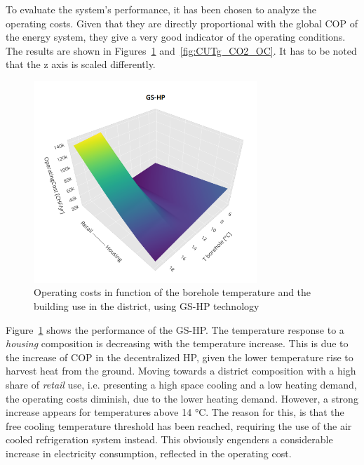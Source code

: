 \documentclass{article}
\begin{document}
To evaluate the system's performance, it has been chosen to analyze the operating costs. Given that they are directly proportional with the global COP of the energy system, they give a very good indicator of the operating conditions. The results are shown in Figures~\ref{fig:CUTg_OC} and~\ref{fig:CUTg_CO2_OC}. It has to be noted that the z axis is scaled differently.\\

\begin{figure}[htp]
	\centering
	\includegraphics[width=0.75\textwidth]{CUTg_SA_OC.png}
	\caption{Operating costs in function of the borehole temperature and the building use in the district, using GS-HP technology}
	\label{fig:CUTg_OC}
\end{figure}

Figure~\ref{fig:CUTg_OC} shows the performance of the GS-HP. The temperature response to a \textit{housing} composition is decreasing with the temperature increase. This is due to the increase of COP in the decentralized HP, given the lower temperature rise to harvest heat from the ground. Moving towards a district composition with a high share of \textit{retail} use, i.e. presenting a high space cooling and a low heating demand, the operating costs diminish, due to the lower heating demand. However, a strong increase appears for temperatures above 14 \si{\celsius}. The reason for this, is that the free cooling temperature threshold has been reached, requiring the use of the air cooled refrigeration system instead. This obviously engenders a considerable increase in electricity consumption, reflected in the operating cost.
\end{document}

